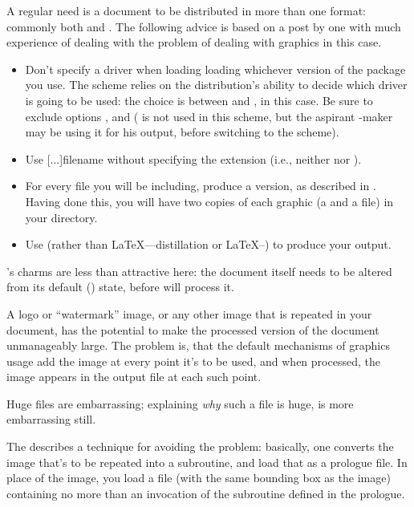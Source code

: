 A regular need is a document to be distributed in more than
one format: commonly both \PS{} and .  The
following advice is based on a post by one with much experience of
dealing with the problem of dealing with  graphics in this
case.
\begin{itemize}
\item Don't specify a driver when loading loading whichever version of
  the  package you use.  The scheme relies on the
  distribution's ability to decide which driver is going to be used:
  the choice is between  and \PDFTeX{}, in this case.
  Be sure to exclude options ,  and
   ( is not used in this scheme,
  but the aspirant -maker may be using it for his output,
  before switching to the scheme).
\item Use [...]{filename} without
  specifying the extension (i.e., neither  nor
  ).
\item For every  file you will be including, produce a
   version, as described in %
  .  Having
  done this, you will have two copies of each graphic (a 
  and a  file) in your directory.
\item Use \PDFLaTeX{} (rather than
  \LaTeX{}----distillation or
  \LaTeX{}--) to produce your  output.
\end{itemize}
's charms are less than attractive here: the
document itself needs to be altered from its default
() state, before  will process it.


A logo or ``watermark'' image, or any other image that is repeated in
your document, has the potential to make the processed version of the
document unmanageably large.  The problem is, that the default
mechanisms of graphics usage add the image at every point it's to be
used, and when processed, the image appears in the output file at each
such point.

Huge \PS{} files are embarrassing; explaining \emph{why} such a file
is huge, is more embarrassing still.

The 
describes a technique for avoiding the problem: basically, one
converts the image that's to be repeated into a \PS{} subroutine, and
load that as a  prologue file.  In place of the image,
you load a file (with the same bounding box as the image) containing
no more than an invocation of the subroutine defined in the prologue.


